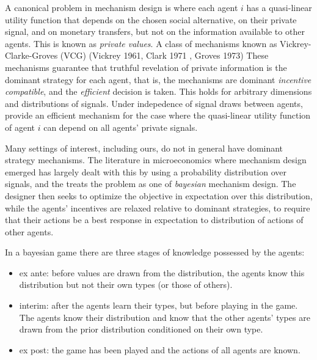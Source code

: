 A canonical problem in mechanism design is where each agent $i$ has a quasi-linear utility function that depends on the chosen social alternative, on their private signal, and on monetary transfers, but not on the information available to other agents.
This is known as \emph{private values}.
A class of mechanisms known as Vickrey-Clarke-Groves (VCG)  (Vickrey 1961, Clark 1971 , Groves 1973)
These mechanisms guarantee that truthful revelation of private information is the dominant strategy for each agent, that is, the mechanisms are dominant \emph{incentive compatible}, and the \emph{efficient} decision is taken. 
This holds for arbitrary dimensions and distributions of signals.
Under indepedence of signal draws between agents, \cite{jehiel2001efficient} provide an efficient mechanism for the case where the quasi-linear utility function of agent $i$ can depend on all agents' private signals. 

Many settings of interest, including ours, do not in general have dominant strategy mechanisms. 
The literature in microeconomics where mechanism design emerged has largely dealt with this by using a probability distribution over signals, and the treats the problem as one of \emph{bayesian} mechanism design.
The designer then seeks to optimize the objective in expectation over this distribution, while the agents' incentives are relaxed relative to dominant strategies, to require that their actions be a best response in expectation to distribution of actions of other agents.

In a bayesian game there are three stages of knowledge possessed by the agents:
\begin{itemize}
 \item ex ante: before values are drawn from the distribution, the agents know this distribution but not their own types (or those of others). 
 \item interim: after the agents learn their types, but before playing in the game. The agents know their distribution and know that the other agents' types are drawn from the prior distribution conditioned on their own type.
 \item ex post: the game has been played and the actions of all agents are known.
\end{itemize}

